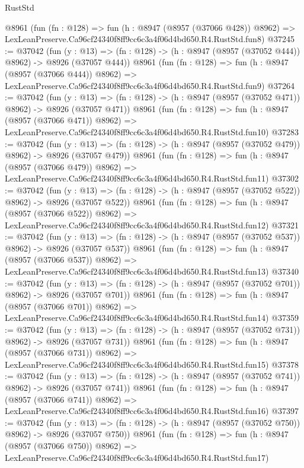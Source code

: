 \begin{lexlean}{RustStd}
\begin{coremodule}
    @8961
    (fun (fn : @128) =>
    fun (h : @8947 (@8957 (@37066 @428)) @8962) =>
    LexLeanPreserve.Ca96cf24340f8ff9cc6c3a4f06d4bd650.R4.RustStd.fun8)
@37245 := @37042
    (fun (y : @13) => (fn : @128) -> (h : @8947 (@8957 (@37052 @444)) @8962) -> @8926 (@37057 @444))
    @8961
    (fun (fn : @128) =>
    fun (h : @8947 (@8957 (@37066 @444)) @8962) =>
    LexLeanPreserve.Ca96cf24340f8ff9cc6c3a4f06d4bd650.R4.RustStd.fun9)
@37264 := @37042
    (fun (y : @13) => (fn : @128) -> (h : @8947 (@8957 (@37052 @471)) @8962) -> @8926 (@37057 @471))
    @8961
    (fun (fn : @128) =>
    fun (h : @8947 (@8957 (@37066 @471)) @8962) =>
    LexLeanPreserve.Ca96cf24340f8ff9cc6c3a4f06d4bd650.R4.RustStd.fun10)
@37283 := @37042
    (fun (y : @13) => (fn : @128) -> (h : @8947 (@8957 (@37052 @479)) @8962) -> @8926 (@37057 @479))
    @8961
    (fun (fn : @128) =>
    fun (h : @8947 (@8957 (@37066 @479)) @8962) =>
    LexLeanPreserve.Ca96cf24340f8ff9cc6c3a4f06d4bd650.R4.RustStd.fun11)
@37302 := @37042
    (fun (y : @13) => (fn : @128) -> (h : @8947 (@8957 (@37052 @522)) @8962) -> @8926 (@37057 @522))
    @8961
    (fun (fn : @128) =>
    fun (h : @8947 (@8957 (@37066 @522)) @8962) =>
    LexLeanPreserve.Ca96cf24340f8ff9cc6c3a4f06d4bd650.R4.RustStd.fun12)
@37321 := @37042
    (fun (y : @13) => (fn : @128) -> (h : @8947 (@8957 (@37052 @537)) @8962) -> @8926 (@37057 @537))
    @8961
    (fun (fn : @128) =>
    fun (h : @8947 (@8957 (@37066 @537)) @8962) =>
    LexLeanPreserve.Ca96cf24340f8ff9cc6c3a4f06d4bd650.R4.RustStd.fun13)
@37340 := @37042
    (fun (y : @13) => (fn : @128) -> (h : @8947 (@8957 (@37052 @701)) @8962) -> @8926 (@37057 @701))
    @8961
    (fun (fn : @128) =>
    fun (h : @8947 (@8957 (@37066 @701)) @8962) =>
    LexLeanPreserve.Ca96cf24340f8ff9cc6c3a4f06d4bd650.R4.RustStd.fun14)
@37359 := @37042
    (fun (y : @13) => (fn : @128) -> (h : @8947 (@8957 (@37052 @731)) @8962) -> @8926 (@37057 @731))
    @8961
    (fun (fn : @128) =>
    fun (h : @8947 (@8957 (@37066 @731)) @8962) =>
    LexLeanPreserve.Ca96cf24340f8ff9cc6c3a4f06d4bd650.R4.RustStd.fun15)
@37378 := @37042
    (fun (y : @13) => (fn : @128) -> (h : @8947 (@8957 (@37052 @741)) @8962) -> @8926 (@37057 @741))
    @8961
    (fun (fn : @128) =>
    fun (h : @8947 (@8957 (@37066 @741)) @8962) =>
    LexLeanPreserve.Ca96cf24340f8ff9cc6c3a4f06d4bd650.R4.RustStd.fun16)
@37397 := @37042
    (fun (y : @13) => (fn : @128) -> (h : @8947 (@8957 (@37052 @750)) @8962) -> @8926 (@37057 @750))
    @8961
    (fun (fn : @128) =>
    fun (h : @8947 (@8957 (@37066 @750)) @8962) =>
    LexLeanPreserve.Ca96cf24340f8ff9cc6c3a4f06d4bd650.R4.RustStd.fun17)

\end{coremodule}
\end{lexlean}
